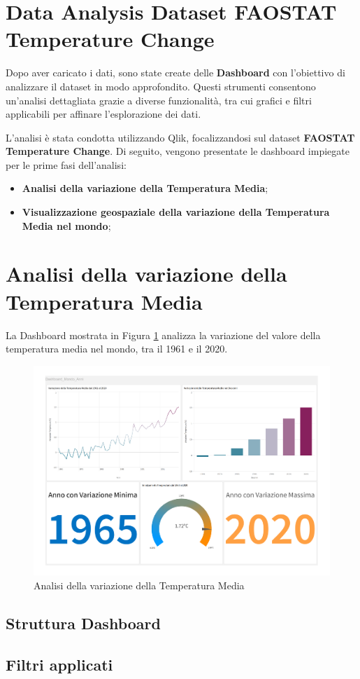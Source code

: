 \section{Data Analysis Dataset FAOSTAT Temperature Change}

Dopo aver caricato i dati, sono state create delle \textbf{Dashboard} con l'obiettivo di analizzare il dataset in modo approfondito. Questi strumenti consentono un'analisi dettagliata grazie a diverse funzionalità, tra cui grafici e filtri applicabili per affinare l'esplorazione dei dati.  

L'analisi è stata condotta utilizzando Qlik, focalizzandosi sul dataset \textbf{FAOSTAT Temperature Change}. Di seguito, vengono presentate le dashboard impiegate per le prime fasi dell'analisi:

\begin{itemize}
    \item \textbf{Analisi della variazione della Temperatura Media};
    \item \textbf{Visualizzazione geospaziale della variazione della Temperatura Media nel mondo};
\end{itemize}

\section{Analisi della variazione della Temperatura Media}
La Dashboard mostrata in Figura \ref{fig:dashboard_world} analizza la variazione del valore della temperatura media nel mondo, tra il 1961 e il 2020. 

\begin{figure}[h!]
    \centering
    \includegraphics[width=1\linewidth]{capitolo_2/img2/Dashboard_world.pdf}
    \caption{Analisi della variazione della Temperatura Media}
    \label{fig:dashboard_world}
\end{figure}

\subsection{Struttura Dashboard}

\subsection{Filtri applicati}

